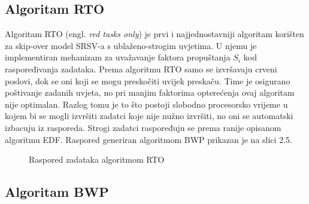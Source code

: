 \documentclass[../zavrsni.tex]{subfiles}
\begin{document}
\subsection{Algoritam RTO}

Algoritam RTO (engl. \textit{red tasks only}) je prvi i najjednostavniji algoritam korišten za skip-over model SRSV-a s ublaženo-strogim uvjetima.
U njemu je implementiran mehanizam za uvažavanje faktora propuštanja $S_i$ kod raspoređivanja zadataka.
Prema algoritmu RTO samo se izvršavaju crveni poslovi, dok se oni koji se mogu preskočiti uvijek preskaču. 
Time je osigurano poštivanje zadanih uvjeta, no pri manjim 
faktorima opterećenja ovaj algoritam nije optimalan. Razlog tomu je to što postoji slobodno procesorsko vrijeme u kojem bi se mogli 
izvršiti zadatci koje nije nužno izvršiti, no oni se automatski izbacuju iz rasporeda. Strogi zadatci raspoređuju se prema 
ranije opisanom algoritmu EDF. Raspored generiran algoritmom BWP prikazan je na slici 2.5. 

\begin{figure}[h!]
    \centering

    \begin{RTGrid}[width=13cm]{3}{24}

    
  
    
    

    \end{RTGrid}

    \caption{Raspored zadataka algoritmom RTO}
    \label{fig:ex1}
  \end{figure}


\subsection{Algoritam BWP}
\end{document}
